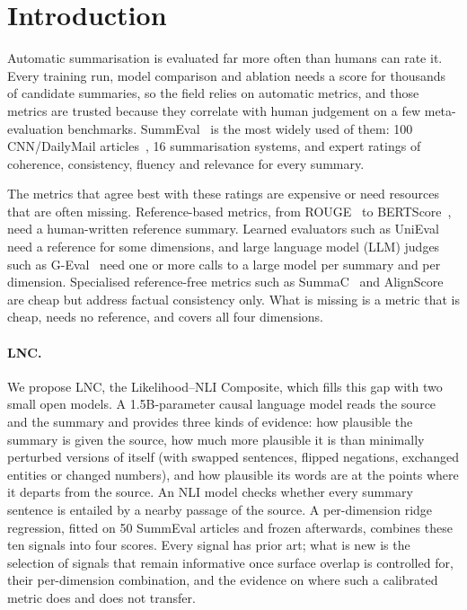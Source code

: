 \section{Introduction}
\label{sec:introduction}

Automatic summarisation is evaluated far more often than humans can rate it. Every training run, model comparison and ablation needs a score for thousands of candidate summaries, so the field relies on automatic metrics, and those metrics are trusted because they correlate with human judgement on a few meta-evaluation benchmarks. SummEval~\citep{fabbri2021summeval} is the most widely used of them: 100 CNN/DailyMail articles~\citep{hermann2015cnndm}, 16 summarisation systems, and expert ratings of coherence, consistency, fluency and relevance for every summary.

The metrics that agree best with these ratings are expensive or need resources that are often missing. Reference-based metrics, from ROUGE~\citep{lin2004rouge} to BERTScore~\citep{zhang2020bertscore}, need a human-written reference summary. Learned evaluators such as UniEval~\citep{zhong2022unieval} need a reference for some dimensions, and large language model (LLM) judges such as G-Eval~\citep{liu2023geval} need one or more calls to a large model per summary and per dimension. Specialised reference-free metrics such as SummaC~\citep{laban2022summac} and AlignScore~\citep{zha2023alignscore} are cheap but address factual consistency only. What is missing is a metric that is cheap, needs no reference, and covers all four dimensions.

\paragraph{LNC.} We propose LNC, the Likelihood--NLI Composite, which fills this gap with two small open models. A 1.5B-parameter causal language model reads the source and the summary and provides three kinds of evidence: how plausible the summary is given the source, how much more plausible it is than minimally perturbed versions of itself (with swapped sentences, flipped negations, exchanged entities or changed numbers), and how plausible its words are at the points where it departs from the source. An NLI model checks whether every summary sentence is entailed by a nearby passage of the source. A per-dimension ridge regression, fitted on 50 SummEval articles and frozen afterwards, combines these ten signals into four scores. Every signal has prior art; what is new is the selection of signals that remain informative once surface overlap is controlled for, their per-dimension combination, and the evidence on where such a calibrated metric does and does not transfer.

